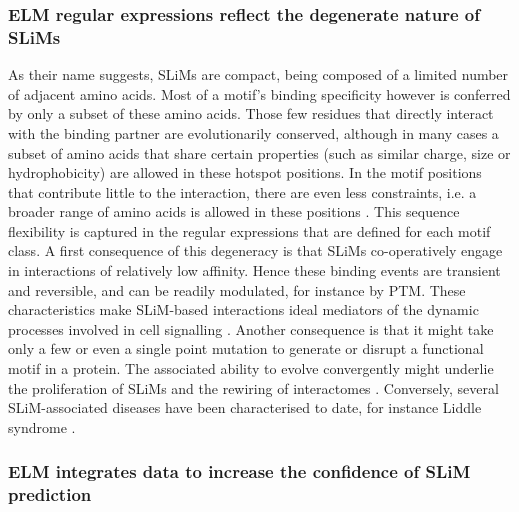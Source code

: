 \documentclass[12pt]{article}
\begin{document}
	\subsubsection*{ELM regular expressions reflect the degenerate nature of SLiMs}

	As their name suggests, SLiMs are compact, being composed of a limited number of
	adjacent amino acids. Most of a motif's binding specificity however is conferred
	by only a subset of these amino acids. Those few residues that directly interact
	with the binding partner are evolutionarily conserved, although in many cases a
	subset of amino acids that share certain properties (such as similar charge,
	size or hydrophobicity) are allowed in these hotspot positions. In the motif
	positions that contribute little to the interaction, there are even less
	constraints, i.e. a broader range of amino acids is allowed in these positions
	\citep{21909575}. This sequence flexibility is captured in the regular
	expressions that are defined for each motif class. A first consequence of this
	degeneracy is that SLiMs co-operatively engage in interactions of relatively low
	affinity. Hence these binding events are transient and reversible, and can be
	readily modulated, for instance by PTM. These characteristics make SLiM-based
	interactions ideal mediators of the dynamic processes involved in cell
	signalling \citep{22480932}. Another consequence is that it might take only a few
	or even a single point mutation to generate or disrupt a functional motif in a
	protein. The associated ability to evolve convergently might underlie the
	proliferation of SLiMs and the rewiring of interactomes \citep{26589632,
	22346764}. Conversely, several SLiM-associated diseases have been
	characterised to date, for instance Liddle syndrome \citep{15483078}.

	\subsubsection*{ELM integrates data to increase the confidence of SLiM prediction}
\end{document}
